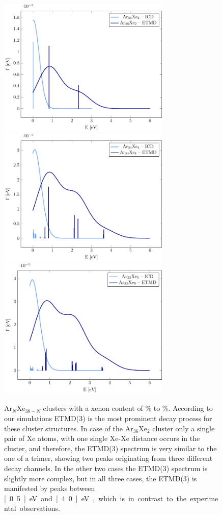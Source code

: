 \begin{figure}
 \centering
 \includegraphics[width=8.2cm]{pics/Ar36Xe2.pdf}
 \includegraphics[width=8.2cm]{pics/Ar34Xe4.pdf}
 \includegraphics[width=8.2cm]{pics/Ar33Xe5.pdf}
 \caption{Ar$_N$Xe$_{38-N}$ clusters with a xenon content of
          \unit[5]{\%} to \unit[13]{\%}.
          According to our simulations ETMD(3) is the most prominent decay
          process for these cluster structures.
          In case of the Ar$_{36}$Xe$_2$ cluster only a single pair of Xe
          atoms, with one single Xe-Xe distance occurs in the cluster,
          and therefore, the ETMD(3) spectrum is very similar
          to the one of a trimer, showing two peaks originating
          from three different decay channels. In the other two cases the ETMD(3)
          spectrum is slightly more complex, but in all three cases, the ETMD(3)
          is manifested by peaks between \unit[0.5]{eV} and \unit[4.0]{eV}, which 
          is in contrast to the experimental observations.}
 \label{figure:ArXe_lt15}
\end{figure}

